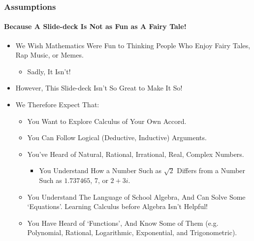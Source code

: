 \begin{frame}
\frametitle{Assumptions}
\framesubtitle{Because A Slide-deck Is Not as Fun as A Fairy Tale!}
\label{slide:assumptions}
\begin{itemize}
\pause
\item We Wish Mathematics Were Fun to Thinking People Who Enjoy Fairy Tales, Rap Music, or Memes.
\begin{itemize}
\pause
\item Sadly, It Isn't!
\end{itemize}
\pause
\item However, This Slide-deck \alert{Isn't So Great to Make It So}!
\pause
\item We Therefore Expect That:
\begin{itemize}
\pause
\item You Want to \alert{Explore Calculus of Your Own Accord}.
\pause
\item You Can \alert{Follow Logical {\tiny (Deductive, Inductive)} Arguments}.
\pause
\item You've Heard of \alert{Natural, Rational, Irrational, Real, Complex Numbers}.
\begin{itemize}
\pause
\item You Understand How a Number Such as \alert{$\sqrt{2}$ Differs from} a Number Such as \alert{$1.737465$, 7, or $2+3i$}.
\end{itemize}
\pause
\item You \alert{Understand The Language of School Algebra}, And \alert{Can Solve Some `Equations'}. Learning \alert{Calculus before Algebra Isn't Helpful}!
\pause 
\item You Have Heard of \alert{`Functions'}, And Know Some of Them (e.g. \alert{Polynomial, Rational, Logarithmic, Exponential, and Trigonometric}).
\end{itemize}
\end{itemize}
\end{frame}
